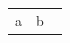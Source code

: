 \documentclass{article}
\begin{document}
\begin{longtable}{cc}
a & b \
\end{longtable}
\end{document}

